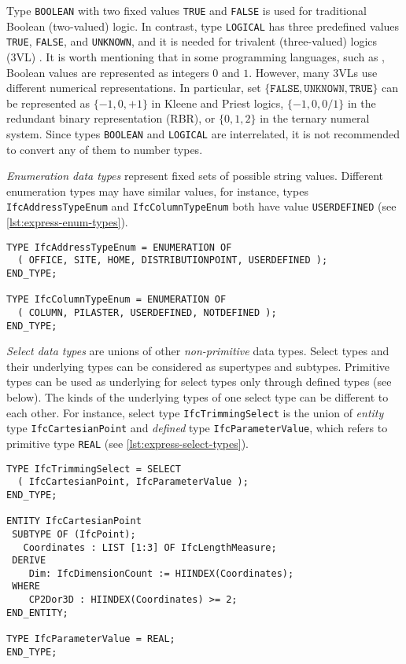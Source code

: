 Type \texttt{BOOL\-EAN} with two fixed values \texttt{TRUE} and \texttt{FALSE} is used for traditional Boolean (two-valued) logic.
In contrast, type \texttt{LOG\-I\-CAL} has three predefined values \texttt{TRUE},  \texttt{FALSE}, and \texttt{UNKNOWN}, and it is needed for trivalent (three-valued) logics (3VL) \cite{fronthofer2011manyvaluedlogics}.
It is worth mentioning that in some programming languages, such as \CPP{}, Boolean values are represented as integers $0$ and $1$.
However, many 3VLs use different numerical representations.
In particular, set $ \{\texttt{FALSE}, \texttt{UNKNOWN}, \texttt{TRUE}\} $ can be represented as
$ \{-1, 0, +1\} $ in Kleene and Priest logics,
$ \{-1, 0, 0/1\} $ in the redundant binary representation (RBR), 
or $ \{0, 1, 2\} $ in the ternary numeral system.
Since types \texttt{BOOLEAN} and \texttt{LOGICAL} are interrelated, it is not recommended to convert any of them to number types.


\emph{Enumeration data types} represent fixed sets of possible string values.
Different enumeration types may have similar values, for instance, types \texttt{IfcAddressTypeEnum} and \texttt{IfcColumnTypeEnum} both have value \texttt{USERDEFINED} (see \autoref{lst:express-enum-types}).


\begin{lstlisting}[caption={Printout of enumeration types \texttt{IfcAddressTypeEnum} and \texttt{IfcColumnTypeEnum}.},label=lst:express-enum-types]
TYPE IfcAddressTypeEnum = ENUMERATION OF
  ( OFFICE, SITE, HOME, DISTRIBUTIONPOINT, USERDEFINED );
END_TYPE;

TYPE IfcColumnTypeEnum = ENUMERATION OF
  ( COLUMN, PILASTER, USERDEFINED, NOTDEFINED );
END_TYPE;
\end{lstlisting}


\emph{Select data types} are unions of other \emph{non-primitive} data types.
Select types and their underlying types can be considered as supertypes and subtypes.
Primitive types can be used as underlying for select types only through defined types (see below).
The kinds of the underlying types of one select type can be different to each other.
For instance, select type \texttt{IfcTrimmingSelect} is the union of \emph{entity} type \texttt{IfcCartesianPoint} and \emph{defined} type \texttt{IfcParameterValue}, which refers to primitive type \texttt{REAL} (see \autoref{lst:express-select-types}).


\begin{lstlisting}[caption={Printout of select type \texttt{IfcTrimmingSelect} and its underlying types.},label=lst:express-select-types]
TYPE IfcTrimmingSelect = SELECT
  ( IfcCartesianPoint, IfcParameterValue );
END_TYPE;

ENTITY IfcCartesianPoint
 SUBTYPE OF (IfcPoint);
   Coordinates : LIST [1:3] OF IfcLengthMeasure;
 DERIVE
    Dim: IfcDimensionCount := HIINDEX(Coordinates);
 WHERE
    CP2Dor3D : HIINDEX(Coordinates) >= 2;
END_ENTITY;

TYPE IfcParameterValue = REAL;
END_TYPE;
\end{lstlisting}




